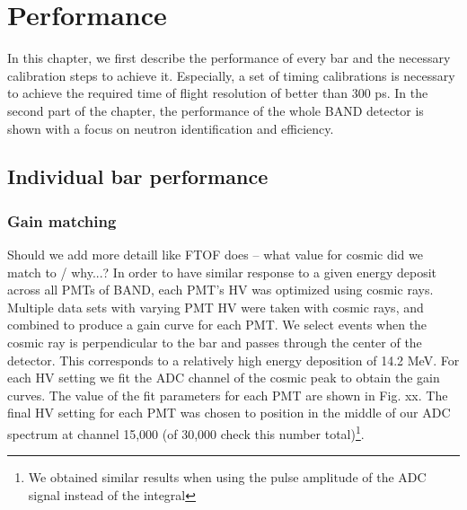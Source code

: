 \documentclass[3p,final,twocolumn]{elsarticle}
\begin{document}
\section{Performance}
In this chapter, we first describe the performance of every bar and the necessary calibration steps to achieve it. Especially, a set of timing calibrations is necessary to achieve the required time of flight resolution of better than 300 \si{\pico\s}.
In the second part of the chapter, the performance of the whole BAND detector is shown with a focus on neutron identification and efficiency.
\subsection{Individual bar performance}
\subsubsection{Gain matching}
{\color{red} Should we add more detaill like FTOF does -- what value for cosmic did we match to / why...?}
In order to have similar response to a given energy deposit across all PMTs of BAND, each PMT's HV was optimized using
cosmic rays. Multiple data sets with varying PMT HV were taken with cosmic rays, and combined to produce a gain curve for 
each PMT. 
We select events when the cosmic ray is perpendicular to the bar and passes through the center of the detector. This corresponds to a relatively high energy deposition of 14.2 \si{\mega\eV}. For each HV setting we fit the ADC channel of the cosmic peak to obtain the gain curves. The value of the fit parameters for each PMT are shown in Fig. xx. The final HV setting for each PMT was chosen to position in the middle of our ADC spectrum at channel 15,000 (of 30,000 {\color{red} check this number} total)\footnote{We obtained similar results when using the pulse amplitude of the ADC signal instead of the integral}.
\end{document}
